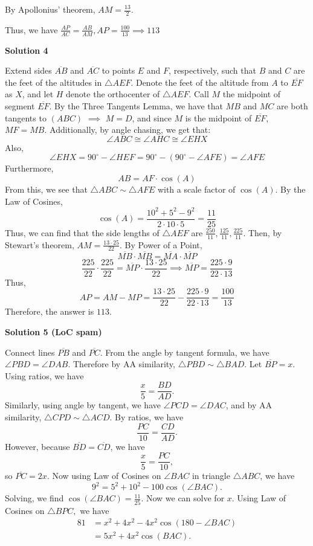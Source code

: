 \begin{enumerate}
 By Apollonius' theorem, $AM=\frac{13}{2}$. 

 Thus, we have $\frac{AP}{AC}=\frac{AB}{AM}, AP=\frac{100}{13}\implies \boxed{113}$




\textbf{Solution 4}

Extend sides $\overline{AB}$ and $\overline{AC}$ to points $E$ and $F$, respectively, such that $B$ and $C$ are the feet of the altitudes in $\triangle AEF$. Denote the feet of the altitude from $A$ to $\overline{EF}$ as $X$, and let $H$ denote the orthocenter of $\triangle AEF$. Call $M$ the midpoint of segment $\overline{EF}$. By the Three Tangents Lemma, we have that $MB$ and $MC$ are both tangents to $(ABC)$ $\implies$ $M = D$, and since $M$ is the midpoint of $\overline{EF}$, $MF = MB$. Additionally, by angle chasing, we get that: 
 \[\angle ABC \cong \angle AHC \cong \angle EHX\]Also, 
 \[\angle EHX = 90 ^\circ - \angle HEF = 90 ^\circ - (90 ^\circ - \angle AFE) = \angle AFE\] Furthermore, 
 \[AB = AF \cdot \cos(A)\]From this, we see that $\triangle ABC \sim \triangle AFE$ with a scale factor of $\cos(A)$. By the Law of Cosines, 
 \[\cos(A) = \frac{10^2 + 5^2 - 9^2}{2 \cdot 10 \cdot 5} = \frac{11}{25}\] Thus, we can find that the side lengths of $\triangle AEF$ are $\frac{250}{11}, \frac{125}{11}, \frac{225}{11}$. Then, by Stewart's theorem, $AM = \frac{13 \cdot 25}{22}$. By Power of a Point, 
 \[\overline{MB} \cdot \overline{MB} = \overline{MA} \cdot \overline{MP}\]
 \[\frac{225}{22} \cdot \frac{225}{22} = \overline{MP} \cdot \frac{13 \cdot 25}{22} \implies \overline{MP} = \frac{225 \cdot 9}{22 \cdot 13}\]Thus, 
 \[AP = AM - MP = \frac{13 \cdot 25}{22} - \frac{225 \cdot 9}{22 \cdot 13} = \frac{100}{13}\]Therefore, the answer is $\boxed{113}$.

 



\textbf{Solution 5 (LoC spam)}

Connect lines $\overline{PB}$ and $\overline{PC}$. From the angle by tangent formula, we have $\angle PBD = \angle DAB$. Therefore by AA similarity, $\triangle PBD \sim \triangle BAD$. Let $\overline{BP} = x$. Using ratios, we have 
 \[\frac{x}{5}=\frac{BD}{AD}.\] Similarly, using angle by tangent, we have $\angle PCD = \angle DAC$, and by AA similarity, $\triangle CPD \sim \triangle ACD$. By ratios, we have 
 \[\frac{PC}{10}=\frac{CD}{AD}.\] However, because $\overline{BD}=\overline{CD}$, we have 
 \[\frac{x}{5}=\frac{PC}{10},\] so $\overline{PC}=2x.$ Now using Law of Cosines on $\angle BAC$ in triangle $\triangle ABC$, we have 
 \[9^2=5^2+10^2-100\cos(\angle BAC).\] Solving, we find $\cos(\angle BAC)=\frac{11}{25}$. Now we can solve for $x$. Using Law of Cosines on $\triangle BPC,$ we have \begin{align*}81&=x^2+4x^2-4x^2\cos(180-\angle BAC) \\ &= 5x^2+4x^2\cos(BAC). \\\end{align*}



\end{enumerate}
